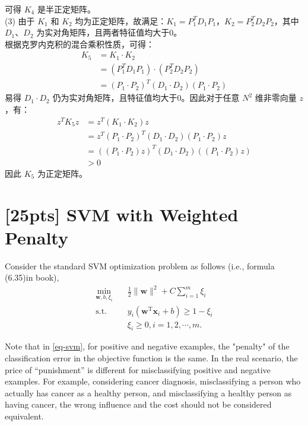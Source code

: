 \documentclass{article}
\begin{document}
		可得 $K_4$ 是半正定矩阵。\\
	(3) 由于 $K_1$ 和 $K_2$ 均为正定矩阵，故满足：$K_1 = P_1^T D_1 P_1$，$K_2 = P_2^T D_2 P_2$，其中 $D_1$、$D_2$ 为实对角矩阵，且两者特征值均大于0。\\
		根据克罗内克积的混合乘积性质，可得：
		\begin{equation}
		\begin{aligned}
		K_5
		&= K_1 \cdot K_2 \\
		&= (P_1^T D_1 P_1) \cdot (P_2^T D_2 P_2) \\
		&= (P_1\cdot P_2)^T (D_1\cdot D_2) (P_1\cdot P_2)
		\end{aligned}
		\end{equation}
		易得 $D_1\cdot D_2$ 仍为实对角矩阵，且特征值均大于0。因此对于任意 $N^2$ 维非零向量 $z$，有：
		\begin{equation}
		\begin{aligned}
		z^T K_5 z
		&= z^T (K_1 \cdot K_2) z \\
		&= z^T (P_1\cdot P_2)^T (D_1\cdot D_2) (P_1\cdot P_2) z \\
		&= ((P_1\cdot P_2)z)^T (D_1\cdot D_2) ((P_1\cdot P_2)z) \\
		&> 0
		\end{aligned}
		\end{equation}
		因此 $K_5$ 为正定矩阵。

\newpage
	
	
    \section{[25pts] SVM with Weighted Penalty}
    Consider the standard SVM optimization problem as follows (i.e., formula (6.35)in book),
    \begin{equation}
    	\label{eq-svm}
    	\begin{split}
    		\min_{\mathbf{w},b,\xi_i}& \quad \frac{1}{2} \lVert \mathbf{w} \rVert^2 + C\sum_{i=1}^m\xi_i\\
    		\text{s.t.}&  \quad y_i(\mathbf{w}^\mathrm{T}\mathbf{x}_i + b)\geq 1-\xi_i\\
    		& \quad \xi_i \geq 0, i = 1,2,\cdots,m.
    	\end{split}
    \end{equation}

    Note that in \eqref{eq-svm}, for positive and negative examples, the "penalty" of the classification error in the objective function is the same. In the real scenario, the price of “punishment” is different for misclassifying positive and negative examples. For example, considering cancer diagnosis, misclassifying a person who actually has cancer as a healthy person, and misclassifying a healthy person as having cancer, the wrong influence and the cost should not be considered equivalent.
\end{document}

